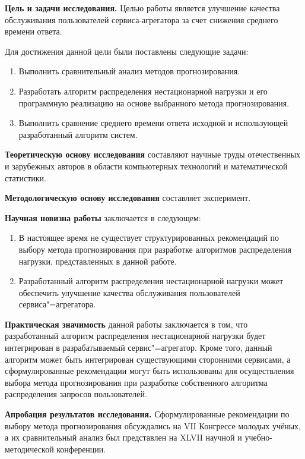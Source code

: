 \documentclass[a4paper,14pt,russian]{extreport}
\begin{document}
{\bfseries Цель и задачи исследования.}  Целью работы является улучшение 
качества обслуживания пользователей сервиса-агрегатора за счет снижения 
среднего времени ответа.

Для достижения данной цели были поставлены следующие задачи:
\begin{enumerate}
	\item Выполнить сравнительный анализ методов прогнозирования.
	\item Разработать алгоритм распределения нестационарной нагрузки и его 
		программную реализацию на основе выбранного метода 
		прогнозирования.
	\item Выполнить сравнение среднего времени ответа исходной и 
		использующей разработанный алгоритм систем.
\end{enumerate}

{\bfseries Теоретическую основу исследования} составляют научные труды
отечественных и зарубежных авторов в области компьютерных технологий и
математической статистики.

{\bfseries Методологическую основу исследования} составляет эксперимент.

{\bfseries Научная новизна работы} заключается в следующем:
\begin{enumerate}
	\item В настоящее время не существует структурированных рекомендаций 
		по выбору метода прогнозирования при разработке алгоритмов 
		распределения нагрузки, представленных в данной работе. 
	\item Разработанный алгоритм распределения нестационарной нагрузки 
		может обеспечить улучшение качества обслуживания пользователей
		сервиса"=агрегатора.
\end{enumerate}

{\bfseries Практическая значимость} данной работы заключается в том, что 
разработанный алгоритм распределения нестационарной нагрузки будет
интегрирован в разрабатываемый сервис"=агрегатор. Кроме того, данный 
алгоритм может быть интегрирован существующими сторонними сервисами, а 
сформулированные рекомендации могут быть использованы для осуществления 
выбора метода прогнозирования при разработке собственного алгоритма 
распределения запросов пользователей.

{\bfseries Апробация результатов исследования.} Сформулированные 
рекомендации по выбору метода прогнозирования обсуждались на VII Конгрессе 
молодых учёных, а их сравнительный анализ был представлен на XLVII научной 
и учебно-методической конференции.
\end{document}
